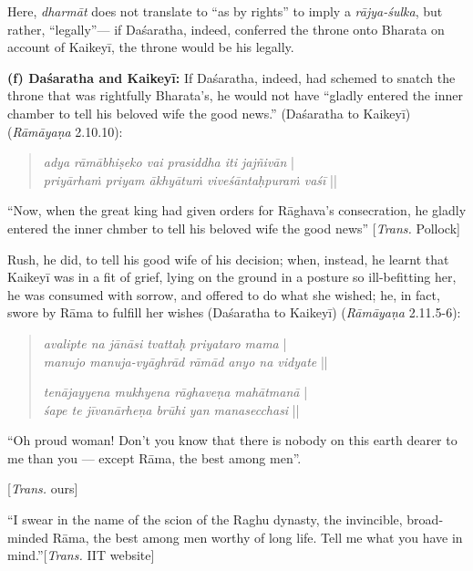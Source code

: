 Here, {\sl dharmāt} does not translate to “as by rights” to imply a {\sl rājya-śulka}, but rather, “legally”--- if Daśaratha, indeed, conferred the throne onto Bharata on account of Kaikeyī, the throne would be his legally. 

\smallskip
\noindent
\textbf{(f) Daśaratha and Kaikeyī:} If Daśaratha, indeed, had schemed to snatch the throne that was rightfully Bharata’s, he would not have “gladly entered the inner chamber to tell his beloved wife the good news.” (Daśaratha to Kaikeyī) ({\sl Rāmāyaṇa} 2.10.10):
\begin{quote}
{{\sl adya rāmābhiṣeko vai prasiddha iti jajñivān}} |\\
{\sl priyārhaṁ priyam ākhyātuṁ viveśāntaḥpuraṁ vaśī} || 
\end{quote}

\begin{myquote}
“Now, when the great king had given orders for Rāghava’s consecration, he gladly entered the inner chmber to tell his beloved wife the good news” [{\sl Trans.} Pollock]
\end{myquote}

Rush, he did, to tell his good wife of his decision; when, instead, he learnt that Kaikeyī was in a fit of grief, lying on the ground in a posture so ill-befitting her, he was consumed with sorrow, and offered to do what she wished; he, in fact, swore by Rāma to fulfill her wishes (Daśaratha to Kaikeyī) ({\sl Rāmāyaṇa} 2.11.5-6): 
\begin{quote}
{{\sl avalipte na jānāsi tvattaḥ priyataro mama}} |\\
{\sl manujo manuja-vyāghrād rāmād anyo na vidyate} || 

{\sl tenājayyena mukhyena rāghaveṇa mahātmanā} |\\
{\sl śape te jīvanārheṇa brūhi yan manasecchasi} ||
\end{quote}

\begin{myquote}
“Oh proud woman! Don't you know that there is nobody on this earth dearer to me than you --- except Rāma, the best among men”.

\hfill [{\sl Trans.} ours]


“I swear in the name of the scion of the Raghu dynasty, the invincible, broad-minded Rāma, the best among men worthy of long life. Tell me what you have in mind.”\hfill [{\sl Trans.} IIT website]
\end{myquote}


